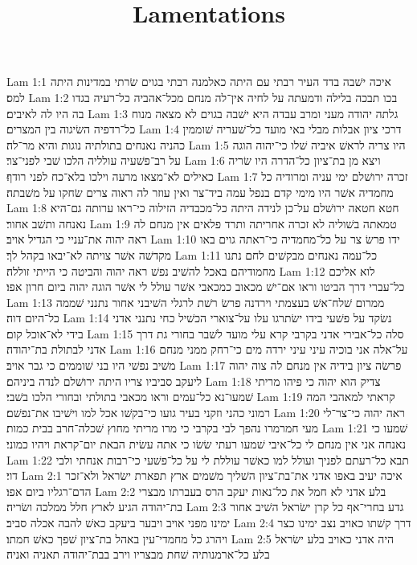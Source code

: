 

\title{Lamentations}

Lam 1:1  איכה ישׁבה בדד העיר רבתי עם היתה כאלמנה רבתי בגוים שׂרתי במדינות היתה למס׃
Lam 1:2  בכו תבכה בלילה ודמעתה על לחיה אין־לה מנחם מכל־אהביה כל־רעיה בגדו בה היו לה לאיבים׃
Lam 1:3  גלתה יהודה מעני ומרב עבדה היא ישׁבה בגוים לא מצאה מנוח כל־רדפיה השׂיגוה בין המצרים׃
Lam 1:4  דרכי ציון אבלות מבלי באי מועד כל־שׁעריה שׁוממין כהניה נאנחים בתולתיה נוגות והיא מר־לה׃
Lam 1:5  היו צריה לראשׁ איביה שׁלו כי־יהוה הוגה על רב־פשׁעיה עולליה הלכו שׁבי לפני־צר׃
Lam 1:6  ויצא מן בת־ציון כל־הדרה היו שׂריה כאילים לא־מצאו מרעה וילכו בלא־כח לפני רודף׃
Lam 1:7  זכרה ירושׁלם ימי עניה ומרודיה כל מחמדיה אשׁר היו מימי קדם בנפל עמה ביד־צר ואין עוזר לה ראוה צרים שׂחקו על משׁבתה׃
Lam 1:8  חטא חטאה ירושׁלם על־כן לנידה היתה כל־מכבדיה הזילוה כי־ראו ערותה גם־היא נאנחה ותשׁב אחור׃
Lam 1:9  טמאתה בשׁוליה לא זכרה אחריתה ותרד פלאים אין מנחם לה ראה יהוה את־עניי כי הגדיל אויב׃
Lam 1:10  ידו פרשׂ צר על כל־מחמדיה כי־ראתה גוים באו מקדשׁה אשׁר צויתה לא־יבאו בקהל לך׃
Lam 1:11  כל־עמה נאנחים מבקשׁים לחם נתנו מחמודיהם באכל להשׁיב נפשׁ ראה יהוה והביטה כי הייתי זוללה׃
Lam 1:12  לוא אליכם כל־עברי דרך הביטו וראו אם־ישׁ מכאוב כמכאבי אשׁר עולל לי אשׁר הוגה יהוה ביום חרון אפו׃
Lam 1:13  ממרום שׁלח־אשׁ בעצמתי וירדנה פרשׂ רשׁת לרגלי השׁיבני אחור נתנני שׁממה כל־היום דוה׃
Lam 1:14  נשׂקד על פשׁעי בידו ישׂתרגו עלו על־צוארי הכשׁיל כחי נתנני אדני בידי לא־אוכל קום׃
Lam 1:15  סלה כל־אבירי אדני בקרבי קרא עלי מועד לשׁבר בחורי גת דרך אדני לבתולת בת־יהודה׃
Lam 1:16  על־אלה אני בוכיה עיני עיני ירדה מים כי־רחק ממני מנחם משׁיב נפשׁי היו בני שׁוממים כי גבר אויב׃
Lam 1:17  פרשׂה ציון בידיה אין מנחם לה צוה יהוה ליעקב סביביו צריו היתה ירושׁלם לנדה ביניהם׃
Lam 1:18  צדיק הוא יהוה כי פיהו מריתי שׁמעו־נא כל־עמים וראו מכאבי בתולתי ובחורי הלכו בשׁבי׃
Lam 1:19  קראתי למאהבי המה רמוני כהני וזקני בעיר גועו כי־בקשׁו אכל למו וישׁיבו את־נפשׁם׃
Lam 1:20  ראה יהוה כי־צר־לי מעי חמרמרו נהפך לבי בקרבי כי מרו מריתי מחוץ שׁכלה־חרב בבית כמות׃
Lam 1:21  שׁמעו כי נאנחה אני אין מנחם לי כל־איבי שׁמעו רעתי שׂשׂו כי אתה עשׂית הבאת יום־קראת ויהיו כמוני׃
Lam 1:22  תבא כל־רעתם לפניך ועולל למו כאשׁר עוללת לי על כל־פשׁעי כי־רבות אנחתי ולבי דוי׃
Lam 2:1  איכה יעיב באפו אדני את־בת־ציון השׁליך משׁמים ארץ תפארת ישׂראל ולא־זכר הדם־רגליו ביום אפו׃
Lam 2:2  בלע אדני לא חמל את כל־נאות יעקב הרס בעברתו מבצרי בת־יהודה הגיע לארץ חלל ממלכה ושׂריה׃
Lam 2:3  גדע בחרי־אף כל קרן ישׂראל השׁיב אחור ימינו מפני אויב ויבער ביעקב כאשׁ להבה אכלה סביב׃
Lam 2:4  דרך קשׁתו כאויב נצב ימינו כצר ויהרג כל מחמדי־עין באהל בת־ציון שׁפך כאשׁ חמתו׃
Lam 2:5  היה אדני כאויב בלע ישׂראל בלע כל־ארמנותיה שׁחת מבצריו וירב בבת־יהודה תאניה ואניה׃
